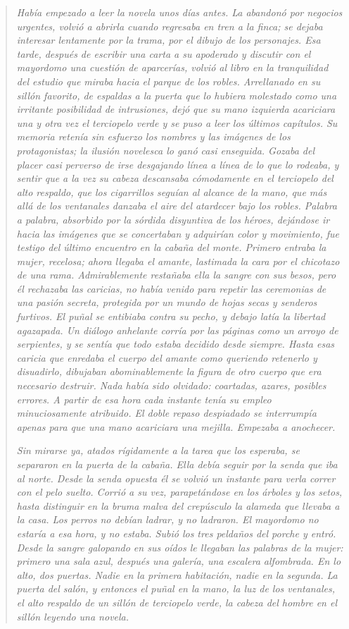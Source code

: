 \begin {quotation}
\textit {Había empezado a leer la novela unos días antes. La abandonó por negocios urgentes, volvió a abrirla cuando regresaba en tren a la finca; se dejaba interesar lentamente por la trama, por el dibujo de los personajes. Esa tarde, después de escribir una carta a su apoderado y discutir con el mayordomo una cuestión de aparcerías, volvió al libro en la tranquilidad del estudio que miraba hacia el parque de los robles. Arrellanado en su sillón favorito, de espaldas a la puerta que lo hubiera molestado como una irritante posibilidad de intrusiones, dejó que su mano izquierda acariciara una y otra vez el terciopelo verde y se puso a leer los últimos capítulos. Su memoria retenía sin esfuerzo los nombres y las imágenes de los protagonistas; la ilusión novelesca lo ganó casi enseguida. Gozaba del placer casi perverso de irse desgajando línea a línea de lo que lo rodeaba, y sentir que a la vez su cabeza descansaba cómodamente en el terciopelo del alto respaldo, que los cigarrillos seguían al alcance de la mano, que más allá de los ventanales danzaba el aire del atardecer bajo los robles. Palabra a palabra, absorbido por la sórdida disyuntiva de los héroes, dejándose ir hacia las imágenes que se concertaban y adquirían color y movimiento, fue testigo del último encuentro en la cabaña del monte. Primero entraba la mujer, recelosa; ahora llegaba el amante, lastimada la cara por el chicotazo de una rama. Admirablemente restañaba ella la sangre con sus besos, pero él rechazaba las caricias, no había venido para repetir las ceremonias de una pasión secreta, protegida por un mundo de hojas secas y senderos furtivos. El puñal se entibiaba contra su pecho, y debajo latía la libertad agazapada. Un diálogo anhelante corría por las páginas como un arroyo de serpientes, y se sentía que todo estaba decidido desde siempre. Hasta esas caricia que enredaba el cuerpo del amante como queriendo retenerlo y disuadirlo, dibujaban abominablemente la figura de otro cuerpo que era necesario destruir. Nada había sido olvidado: coartadas, azares, posibles errores. A partir de esa hora cada instante tenía su empleo minuciosamente atribuido. El doble repaso despiadado se interrumpía apenas para que una mano acariciara una mejilla. Empezaba a anochecer.}

\textit{Sin mirarse ya, atados rígidamente a la tarea que los esperaba, se separaron en la puerta de la cabaña. Ella debía seguir por la senda que iba al norte. Desde la senda opuesta él se volvió un instante para verla correr con el pelo suelto. Corrió a su vez, parapetándose en los árboles y los setos, hasta distinguir en la bruma malva del crepúsculo la alameda que llevaba a la casa. Los perros no debían ladrar, y no ladraron. El mayordomo no estaría a esa hora, y no estaba. Subió los tres peldaños del porche y entró. Desde la sangre galopando en sus oídos le llegaban las palabras de la mujer: primero una sala azul, después una galería, una escalera alfombrada. En lo alto, dos puertas. Nadie en la primera habitación, nadie en la segunda. La puerta del salón, y entonces el puñal en la mano, la luz de los ventanales, el alto respaldo de un sillón de terciopelo verde, la cabeza del hombre en el sillón leyendo una novela.}
\end{quotation}
